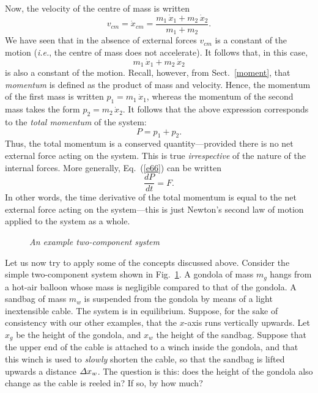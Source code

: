Now, the velocity
of the centre of mass is written
\begin{equation}
v_{cm} = \dot{x}_{cm} = \frac{m_1\,\dot{x}_1+m_2\,\dot{x}_2}{m_1+m_2}.
\end{equation}
We have seen that in the absence of external forces $v_{cm}$ is a constant of the motion
({\em i.e.}, the centre of mass does not accelerate). It follows that, in this case,
 \begin{equation}
m_1\,\dot{x}_1+m_2\,\dot{x}_2
\end{equation}
is also a constant of the motion. Recall, however, from Sect.~\ref{moment}, that
{\em momentum}  is defined as the product of mass and velocity. Hence, the momentum
of the first mass is written $p_1=m_1\,\dot{x}_1$, whereas the momentum of the
second mass takes the form $p_2=m_2\,\dot{x}_2$. It follows that the above expression
corresponds to the {\em total momentum} of the system:
 \begin{equation}
P = p_1 + p_2.
\end{equation}
Thus, the total momentum is a conserved quantity---provided there is no net external force acting on the system.
This is true {\em irrespective} of the nature of the internal forces. 
More generally, Eq.~(\ref{e66}) can be written
\begin{equation}
\frac{dP}{dt} = F.
\end{equation}
In other words, the time derivative of the total momentum is equal to
the net external force acting on the system---this is just Newton's second law of
motion applied to the system as a whole.

\begin{figure}
\epsfysize=3in
\centerline{}
\caption{\em An example two-component system}\label{f46}  
\end{figure}

Let us now try to apply some of the concepts discussed above.
Consider the simple two-component system shown in Fig.~\ref{f46}. A
gondola of mass $m_g$ hangs from a hot-air balloon whose mass
is negligible compared to that of the gondola. A sandbag of mass $m_w$ is
suspended from the gondola by means of a light inextensible cable. The system
is in equilibrium. 
Suppose, for the sake of consistency with our other examples, that the
$x$-axis runs vertically upwards. 
Let $x_g$ be the height of the gondola, and $x_w$  the height of the
sandbag. Suppose that the upper end of the cable is attached to a winch inside the gondola, and
that this winch is used to {\em slowly} shorten the cable, so that the sandbag is lifted upwards
 a distance ${\mit\Delta}x_w$. The question is this: does the height of the gondola
also change as the cable is reeled in? If so, by how much?

